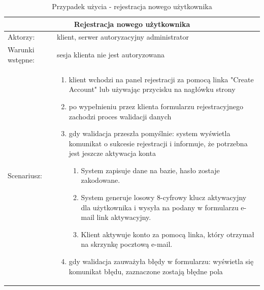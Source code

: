 \begin{table}[h!]
	
	\begin{tabular}{ |p{2cm}||p{13cm}|  }
		
		\hline
		\multicolumn{2}{|c|}{Rejestracja nowego użytkownika} \\
		\hline
		Aktorzy: &klient, serwer autoryzacyjny administrator\\
		\hline
		Warunki wstępne: & sesja klienta nie jest autoryzowana\\ 
		\hline
		Scenariusz: &
		\begin{enumerate}[leftmargin=0em]
			\item klient wchodzi na panel rejestracji za pomocą linka "Create Account" lub używając przycisku na nagłówku strony 
			
			\item po wypełnieniu przez klienta formularzu rejestracyjnego zachodzi proces walidacji danych
			
			\item gdy walidacja przeszła pomyślnie: system wyświetla komunikat o sukcesie rejestracji i informuje, że potrzebna jest jeszcze aktywacja konta
			
			\begin{enumerate}[leftmargin=2em]
				\item System zapisuje dane na bazie, hasło zostaje zakodowane.
				
				\item System generuje losowy 8-cyfrowy klucz aktywacyjny dla użytkownika i wysyła na podany w formularzu e-mail link aktywacyjny.
				
				\item Klient aktywuje konto za pomocą linka, który otrzymał na skrzynkę pocztową e-mail.
			\end{enumerate}
			
			\item gdy walidacja zauważyła błędy w formularzu: wyświetla się komunikat błędu, zaznaczone zostają błędne pola
		\end{enumerate}\\
		\hline
		
	\end{tabular}
	
	\caption{Przypadek użycia - rejestracja nowego użytkownika}
\end{table}

